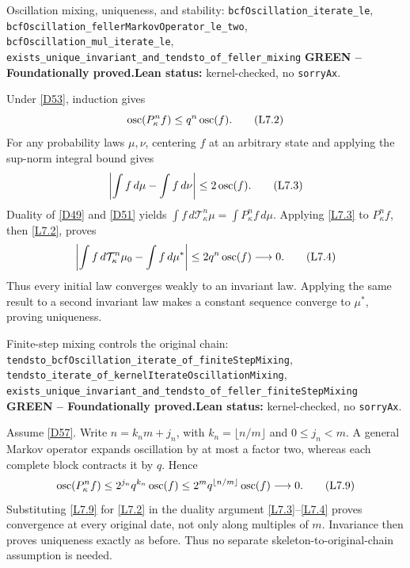\documentclass[11pt]{article}
\newcommand{\leanname}[1]{\nolinkurl{#1}}
\newcommand{\eqL}[1]{\refstepcounter{equation}\tag{L#1}}
\newcommand{\formalcheck}{\textbf{Lean status:} kernel-checked, no \texttt{sorryAx}.}
\newcommand{\greenstatus}{\textcolor{proved}{\textbf{GREEN -- Foundationally proved.}}}
\begin{document}
\begin{greenbox}{Oscillation mixing, uniqueness, and stability:
\leanname{bcfOscillation_iterate_le},
\leanname{bcfOscillation_fellerMarkovOperator_le_two},
\leanname{bcfOscillation_mul_iterate_le},
\leanname{exists_unique_invariant_and_tendsto_of_feller_mixing}}
\greenstatus\quad\formalcheck

Under \eqref{D53}, induction gives
\begin{equation}
 \operatorname{osc}(P_\kappa^n f)
 \le q^n\operatorname{osc}(f).
 \eqL{7.2}\label{L7.2}
\end{equation}
For any probability laws \(\mu,\nu\), centering \(f\) at an arbitrary state
and applying the sup-norm integral bound gives
\begin{equation}
 \left|\int f\,d\mu-\int f\,d\nu\right|
 \le2\operatorname{osc}(f).
 \eqL{7.3}\label{L7.3}
\end{equation}
Duality of \eqref{D49} and \eqref{D51} yields
\(\int f\,d\mathcal T_\kappa^n\mu=\int P_\kappa^n f\,d\mu\).
Applying \eqref{L7.3} to \(P_\kappa^n f\), then \eqref{L7.2}, proves
\begin{equation}
 \left|\int f\,d\mathcal T_\kappa^n\mu_0-
       \int f\,d\mu^*\right|
 \le2q^n\operatorname{osc}(f)\longrightarrow0.
 \eqL{7.4}\label{L7.4}
\end{equation}
Thus every initial law converges weakly to an invariant law.  Applying the
same result to a second invariant law makes a constant sequence converge to
\(\mu^*\), proving uniqueness.
\end{greenbox}

\begin{greenbox}{Finite-step mixing controls the original chain:
\leanname{tendsto_bcfOscillation_iterate_of_finiteStepMixing},
\leanname{tendsto_iterate_of_kernelIterateOscillationMixing},
\leanname{exists_unique_invariant_and_tendsto_of_feller_finiteStepMixing}}
\greenstatus\quad\formalcheck

Assume \eqref{D57}.  Write $n=k_nm+j_n$, with
$k_n=\lfloor n/m\rfloor$ and $0\le j_n<m$.  A general Markov operator
expands oscillation by at most a factor two, whereas each complete block
contracts it by $q$.  Hence
\begin{equation}
 \operatorname{osc}(P_\kappa^n f)
 \le 2^{j_n}q^{k_n}\operatorname{osc}(f)
 \le 2^m q^{\lfloor n/m\rfloor}\operatorname{osc}(f)
 \longrightarrow0.
 \eqL{7.9}\label{L7.9}
\end{equation}
Substituting \eqref{L7.9} for \eqref{L7.2} in the duality argument
\eqref{L7.3}--\eqref{L7.4} proves convergence at every original date, not
only along multiples of $m$.  Invariance then proves uniqueness exactly as
before.  Thus no separate skeleton-to-original-chain assumption is needed.
\end{greenbox}
\end{document}
